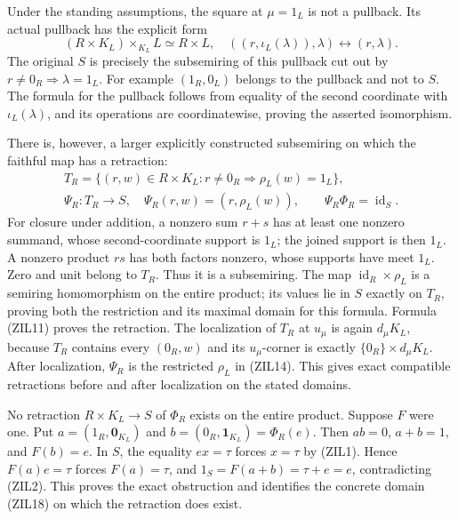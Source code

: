 Under the standing assumptions, the square at $\mu=1_L$ is not
a pullback. Its actual
pullback has the explicit form
\begin{equation}\tag{ZIL17}
 (R\times K_L)\times_{K_L}L\simeq R\times L,
 \quad((r,\iota_L(\lambda)),\lambda)\longleftrightarrow(r,\lambda).
\end{equation}
The original $S$ is precisely the subsemiring of this pullback
cut out by $r\ne0_R\Rightarrow\lambda=1_L$.
For example $(1_R,0_L)$ belongs to the pullback and not to $S$.
The formula for the pullback follows from equality of the second
coordinate with $\iota_L(\lambda)$, and its operations are
coordinatewise, proving the asserted isomorphism.

There is, however, a larger explicitly constructed subsemiring on
which the faithful map has a retraction:
\begin{equation}\tag{ZIL18}
 \begin{gathered}
 T_R=\{(r,w)\in R\times K_L:
             r\ne0_R\Longrightarrow\rho_L(w)=1_L\},\\
 \Psi_R:T_R\longrightarrow S,\quad
       \Psi_R(r,w)=(r,\rho_L(w)),\qquad
 \Psi_R\Phi_R=\operatorname{id}_S.
 \end{gathered}
\end{equation}
For closure under addition, a nonzero sum $r+s$ has at least
one nonzero summand, whose second-coordinate support is $1_L$;
the joined support is then $1_L$. A nonzero product $rs$ has
both factors nonzero, whose supports have meet $1_L$.
Zero and unit belong to $T_R$. Thus it is a subsemiring.
The map $\operatorname{id}_R\times\rho_L$ is a semiring
homomorphism on the entire product; its values lie in $S$
exactly on $T_R$, proving both the restriction and its maximal
domain for this formula. Formula (ZIL11) proves the retraction.
The localization of $T_R$ at $u_\mu$ is again $d_\mu K_L$,
because $T_R$ contains every $(0_R,w)$ and its $u_\mu$-corner
is exactly $\{0_R\}\times d_\mu K_L$.
After localization, $\Psi_R$ is the restricted $\rho_L$ in
(ZIL14). This gives exact compatible retractions before and
after localization on the stated domains.

No retraction $R\times K_L\to S$ of $\Phi_R$ exists on the
entire product. Suppose $F$ were one. Put $a=(1_R,\mathbf0_{K_L})$
and $b=(0_R,\mathbf1_{K_L})=\Phi_R(e)$. Then $ab=0$,
$a+b=1$, and $F(b)=e$. In $S$, the equality $ex=\tau$ forces
$x=\tau$ by (ZIL1). Hence $F(a)e=\tau$ forces $F(a)=\tau$,
and $1_S=F(a+b)=\tau+e=e$, contradicting (ZIL2).
This proves the exact obstruction and identifies the concrete
domain (ZIL18) on which the retraction does exist.

